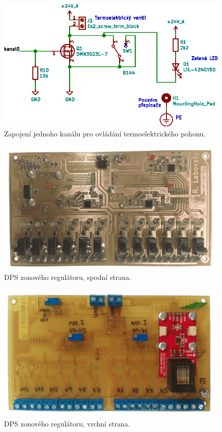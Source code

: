 \begin{figure}[H]
    \centering
    \includegraphics[width=\textwidth]{images/svg/kicad/zonovy-regulator-mosfet-pwm-1-kanal.eps}
    \caption{Zapojení jednoho kanálu pro ovládání termoelektrického pohonu.}
    \label{fig:zonovy-regulator-mosfet-pwm-1-kanal}
\end{figure}

\begin{figure}[H]
    \centering
    \includegraphics[width=0.99\textwidth]{images/zonovy-regulator/dps-zonovy-regulator-spodni-strana.png}
    \caption{DPS zonového regulátoru, spodní strana.}
    \label{fig:dps-zonovy-regulator-spodni-strana}
\end{figure}

\begin{figure}[H]
    \centering
    \includegraphics[width=0.99\textwidth]{images/zonovy-regulator/dps-zonovy-regulator-vrchni-strana.png}
    \caption{DPS zonového regulátoru, vrchní strana.}
    \label{fig:dps-zonovy-regulator-vrchni-strana}
\end{figure}


